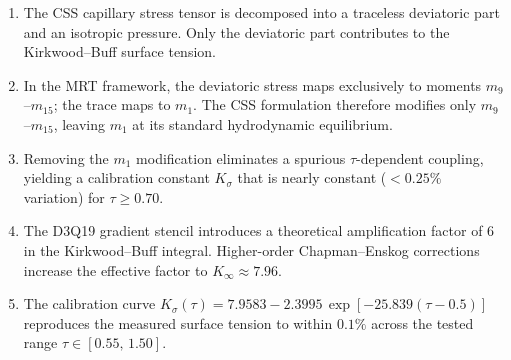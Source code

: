 \documentclass[11pt,a4paper]{article}
\begin{document}
\begin{enumerate}
\item The CSS capillary stress tensor is decomposed into a traceless
  deviatoric part and an isotropic pressure.  Only the deviatoric part
  contributes to the Kirkwood--Buff surface tension.

\item In the MRT framework, the deviatoric stress maps exclusively to
  moments $m_9$--$m_{15}$; the trace maps to $m_1$.  The CSS
  formulation therefore modifies only $m_9$--$m_{15}$, leaving $m_1$
  at its standard hydrodynamic equilibrium.

\item Removing the $m_1$ modification eliminates a spurious
  $\tau$-dependent coupling, yielding a calibration constant
  $K_\sigma$ that is nearly constant ($<0.25\%$ variation) for
  $\tau \ge 0.70$.

\item The D3Q19 gradient stencil introduces a theoretical
  amplification factor of 6 in the Kirkwood--Buff integral.
  Higher-order Chapman--Enskog corrections increase the effective
  factor to $K_\infty \approx 7.96$.

\item The calibration curve $K_\sigma(\tau) = 7.9583 - 2.3995\,
  \exp[-25.839(\tau-0.5)]$ reproduces the measured surface tension
  to within $0.1\%$ across the tested range $\tau\in[0.55,\,1.50]$.
\end{enumerate}
\end{document}
